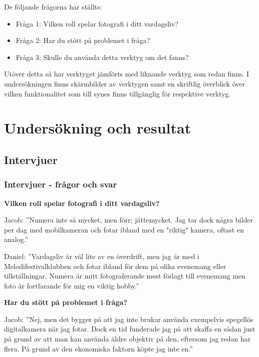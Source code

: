 \documentclass[11pt]{article}
\begin{document}
De följande frågorna har ställts: 
\fussy

\begin{itemize}
    \item Fråga 1: Vilken roll spelar fotografi i ditt vardagsliv?
    \item Fråga 2: Har du stött på problemet i fråga?
    \item Fråga 3: Skulle du använda detta verktyg om det fanns?
\end{itemize}

\bigskip

Utöver detta så har verktyget jämförts med liknande verktyg som redan finns.
I undersökningen finns skärmbilder av verktygen samt en skriftlig överblick över
vilken funktionalitet som till synes finns tillgänglig för respektive verktyg.

\section{Undersökning och resultat}
\subsection{Intervjuer}
\subsubsection{Intervjuer - frågor och svar}
\textbf{Vilken roll spelar fotografi i ditt vardagsliv?}\par

Jacob: ”Numera inte så mycket, men förr; jättemycket. Jag tar dock några bilder
per dag med mobilkameran och fotar ibland med en "riktig" kamera, oftast en
analog.”\par

Daniel: ”Vardagsliv är väl lite av en överdrift, men jag är med i
Melodifestivalklubben och fotar ibland för dem på olika evenemang eller
tillställningar. Numera är mitt fotograferande mest förlagt till evenemang men
foto är fortfarande för mig en viktig hobby.”\par

\textbf{Har du stött på problemet i fråga?}\par

Jacob: ”Nej, men det bygger på att jag inte brukar använda exempelvis spegellös
digitalkamera när jag fotar. Dock en tid funderade jag på att skaffa en sådan
just på grund av att man kan använda äldre objektiv på den, eftersom jag redan
har flera. På grund av den ekonomiska faktorn köpte jag inte en.”\par
\end{document}
